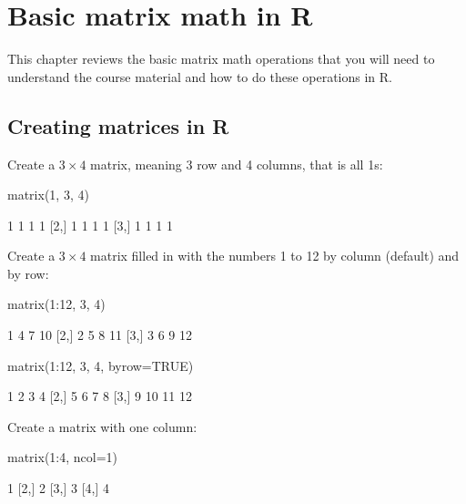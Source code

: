 

\setcounter{MaxMatrixCols}{20}
\usepackage{enumerate}
\usepackage{Sweave}





\chapter{Basic matrix math in R}
\label{chap:basicmat}

This chapter reviews the basic matrix math operations that you will need to understand the course material and how to do these operations in R.

\section{Creating matrices in R}
Create a $3 \times 4$ matrix, meaning 3 row and 4 columns, that is all 1s:
\begin{Schunk}
\begin{Sinput}
 matrix(1, 3, 4)
\end{Sinput}
\begin{Soutput}
     [,1] [,2] [,3] [,4]
[1,]    1    1    1    1
[2,]    1    1    1    1
[3,]    1    1    1    1
\end{Soutput}
\end{Schunk}
Create a $3 \times 4$ matrix filled in with the numbers 1 to 12 by column (default) and by row:
\begin{Schunk}
\begin{Sinput}
 matrix(1:12, 3, 4)
\end{Sinput}
\begin{Soutput}
     [,1] [,2] [,3] [,4]
[1,]    1    4    7   10
[2,]    2    5    8   11
[3,]    3    6    9   12
\end{Soutput}
\begin{Sinput}
 matrix(1:12, 3, 4, byrow=TRUE)
\end{Sinput}
\begin{Soutput}
     [,1] [,2] [,3] [,4]
[1,]    1    2    3    4
[2,]    5    6    7    8
[3,]    9   10   11   12
\end{Soutput}
\end{Schunk}
Create a matrix with one column:
\begin{Schunk}
\begin{Sinput}
 matrix(1:4, ncol=1)
\end{Sinput}
\begin{Soutput}
     [,1]
[1,]    1
[2,]    2
[3,]    3
[4,]    4
\end{Soutput}
\end{Schunk}
